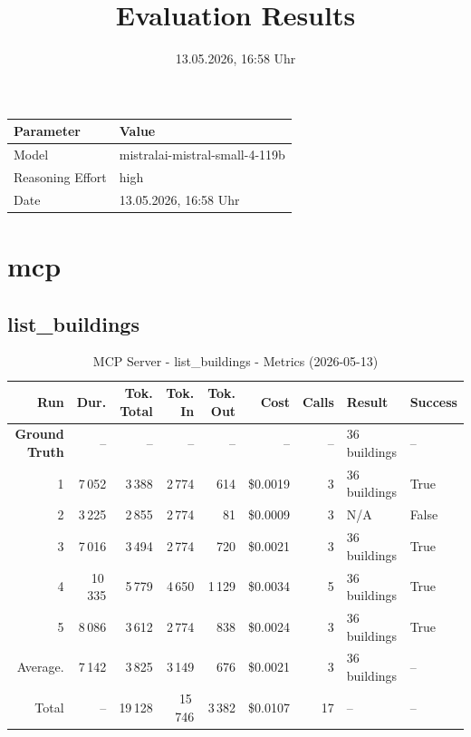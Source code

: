 \documentclass[a4paper,11pt]{article}
\title{Evaluation Results}
\date{13.05.2026, 16:58 Uhr}
\begin{document}
\maketitle

\begin{table}[H]
\centering
\begin{tabular}{l l}
\toprule
\textbf{Parameter} & \textbf{Value} \\
\midrule
Model & mistralai-mistral-small-4-119b \\
Reasoning Effort & high \\
Date & 13.05.2026, 16:58 Uhr \\
\bottomrule
\end{tabular}
\end{table}

\tableofcontents
\clearpage

\section{mcp}

\subsection{list\_buildings}

\begin{table}[ht]
\centering
\scriptsize
\caption{MCP Server - list\_buildings - Metrics (2026-05-13)}
\label{tab:mcp\_list\_buildings\_metrics\_2026-05-13}
\begin{tabular}{r r r r r r r p{3cm} l}
\hline
Run & Dur. & Tok. Total & Tok. In & Tok. Out & Cost & Calls & Result & Success \\
\hline
\textbf{Ground Truth} & -- & -- & -- & -- & -- & -- & 36 buildings & -- \\
\hline
1 & 7\,052 & 3\,388 & 2\,774 & 614 & \$0.0019 & 3 & 36 buildings & True \\
2 & 3\,225 & 2\,855 & 2\,774 & 81 & \$0.0009 & 3 & N/A & False \\
3 & 7\,016 & 3\,494 & 2\,774 & 720 & \$0.0021 & 3 & 36 buildings & True \\
4 & 10\,335 & 5\,779 & 4\,650 & 1\,129 & \$0.0034 & 5 & 36 buildings & True \\
5 & 8\,086 & 3\,612 & 2\,774 & 838 & \$0.0024 & 3 & 36 buildings & True \\
\hline
Average. & 7\,142 & 3\,825 & 3\,149 & 676 & \$0.0021 & 3 & 36 buildings & -- \\
Total & -- & 19\,128 & 15\,746 & 3\,382 & \$0.0107 & 17 & -- & -- \\
\hline
\end{tabular}
\end{table}
\end{document}
